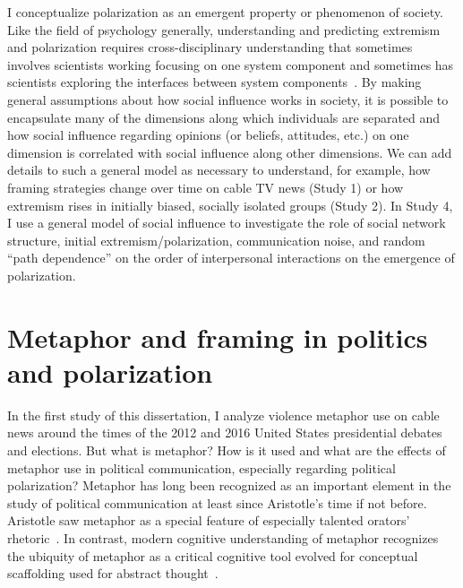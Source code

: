 \documentclass[12pt,letterpaper]{article}
\begin{document}
I conceptualize polarization as an emergent property or phenomenon of society. 
Like the field of psychology generally, understanding and predicting extremism
and polarization requires cross-disciplinary understanding that sometimes
involves scientists working focusing on one system component and sometimes has 
scientists exploring the interfaces between system components~\cite{Brewer2013,Rollwage2019}.
By making general assumptions about how social influence works in society, it is
possible to encapsulate many of the dimensions along which individuals are
separated and how social influence regarding opinions 
(or beliefs, attitudes, etc.) on one dimension
is correlated with social influence along other dimensions. We can add 
details to such a general model as necessary to understand, for example, 
how framing strategies change over time on cable TV news (Study 1) or how
extremism rises in initially biased, socially isolated groups (Study 2). 
In Study 4, I use a general model of social influence to 
investigate the role of social network structure, initial extremism/polarization,
communication noise, and random ``path dependence'' on the order of 
interpersonal interactions on the emergence of polarization.


\section{Metaphor and framing in politics and polarization}

In the first study of this dissertation, I analyze violence metaphor use on
cable news around the times of the 2012 and 2016 United States presidential
debates and elections. But what is metaphor? How is it used and what are the
effects of metaphor use in political communication, especially regarding
political polarization? Metaphor has long been recognized as an important 
element in the study of political 
communication at least since Aristotle's time if not before.
Aristotle saw metaphor as a special 
feature of especially talented orators' rhetoric~\cite{Aristotle1965,Kirby1997}. 
In contrast, modern cognitive understanding of metaphor recognizes the
ubiquity of metaphor as a critical cognitive tool evolved for 
conceptual scaffolding used for abstract 
thought~\cite{Lakoff1980,Heyes2018a,HeyesCognitiveGadgets}.  
\end{document}
